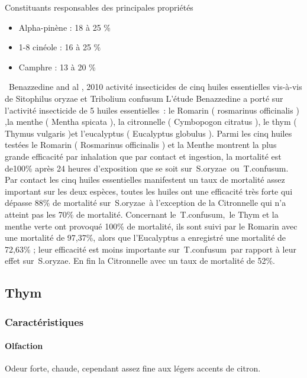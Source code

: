 \documentclass[12pt,a4wide]{article}
\begin{document}
Constituants responsables des principales propriétés

\begin{itemize}
\item Alpha-pinène : 18 à 25 \%
\item 1-8 cinéole : 16 à 25 \%
\item Camphre : 13 à 20 \%
\end{itemize}


 Benazzedine and al , 2010 activité insecticides de cinq huiles essentielles vis-à-vis de Sitophilus oryzae et Tribolium confusum
L'étude Benazzedine a porté sur l'activité insecticide de 5 huiles essentielles : le Romarin ( rosmarinus officinalis ) ,la menthe ( Mentha spicata ), la citronnelle ( Cymbopogon citratus ), le thym ( Thymus vulgaris )et l'eucalyptus ( Eucalyptus globulus ). 
Parmi les cinq huiles testées le Romarin ( Rosmarinus officinalis ) et la Menthe montrent la plus grande efficacité par inhalation que par contact et ingestion, la mortalité est de100\% après 24 heures d'exposition que se soit sur S.oryzae ou T.confusum.
Par contact les cinq huiles essentielles manifestent un taux de mortalité assez important sur les deux espèces, toutes les huiles ont une efficacité très forte qui dépasse 88\% de mortalité sur S.oryzae à l'exception de la Citronnelle qui n'a atteint pas les 70\% de mortalité. Concernant le T.confusum, le Thym et la menthe verte ont provoqué 100\% de mortalité, ils sont suivi par le Romarin avec une mortalité de 97,37\%, alors que l'Eucalyptus a enregistré une mortalité de 72,63\% ; leur efficacité est moins importante sur T.confusum par rapport à leur effet sur S.oryzae. En fin la Citronnelle avec un taux de mortalité de 52\%.


\subsection{Thym}
\label{sec-4-11}

\subsubsection{Caractéristiques}
\label{sec-4-11-1}

\paragraph{Olfaction}
\label{sec-4-11-1-1}

Odeur forte, chaude, cependant assez fine aux légers accents de citron.
\end{document}
